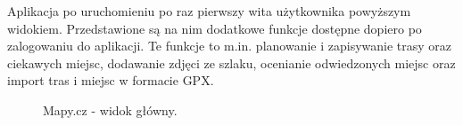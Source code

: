 Aplikacja po uruchomieniu po raz pierwszy wita użytkownika powyższym widokiem. Przedstawione są na nim dodatkowe funkcje dostępne dopiero po zalogowaniu do aplikacji. Te funkcje to m.in. planowanie i zapisywanie trasy oraz ciekawych miejsc, dodawanie zdjęci ze szlaku, ocenianie odwiedzonych miejsc oraz import tras i miejsc w formacie GPX. 
\begin{figure}[H]
    \centering
    \caption{Mapy.cz - widok główny.}
    \label{mapycz:glowna}
\end{figure}
